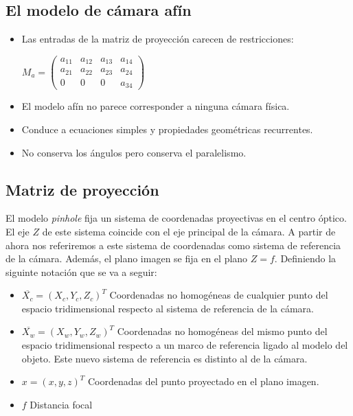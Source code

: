 \subsection{El modelo de cámara afín}
\begin{itemize}
\item Las entradas de la matriz de proyección carecen de restricciones:
  
  $M_a=\begin{pmatrix}a_{11} & a_{12} & a_{13} & a_{14}\\a_{21} & a_{22} & a_{23} & a_{24}\\0 & 0 & 0 & a_{34}\end{pmatrix}$
  
\item El modelo afín no parece corresponder a ninguna cámara física.

\item Conduce a ecuaciones simples y propiedades geométricas recurrentes.

\item No conserva los ángulos pero conserva el paralelismo.
\end{itemize}

\subsection{Matriz de proyección}

El modelo \emph{pinhole} fija un sistema de coordenadas proyectivas en el centro óptico. El eje $Z$ de este sistema coincide con el eje principal de la cámara. A partir de ahora nos referiremos a este sistema de coordenadas como sistema de referencia de la cámara. Además, el plano imagen se fija en el plano $Z = f$.
Definiendo la siguinte notación que se va a seguir:
\begin{itemize}
\item $\overline{X_c} = (X_c , Y_c , Z_c )^T$ Coordenadas no homogéneas de cualquier punto del espacio tridimensional respecto al sistema de referencia de la cámara.
\item $\overline{X_w} = (X_w , Y_w , Z_w )^T$ Coordenadas no homogéneas del mismo punto del espacio tridimensional respecto a un marco de referencia ligado al modelo del objeto. Este nuevo sistema de referencia es distinto al de la cámara.
\item $x = (x, y, z)^T$  Coordenadas del punto proyectado en el plano imagen.
\item $f$  Distancia focal
\end{itemize}

